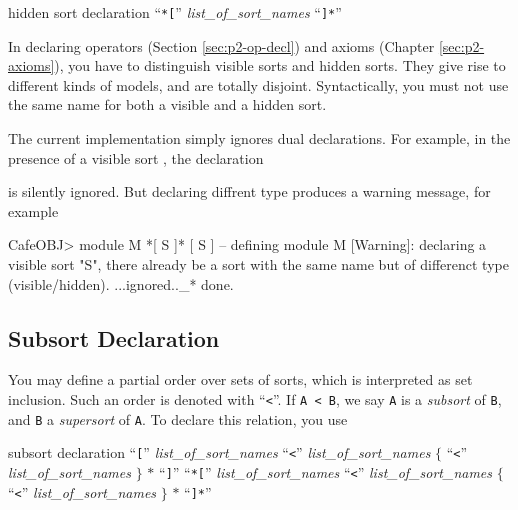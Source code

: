 \documentclass[a4paper]{memoir}
\begin{document}
\begin{bsyntax} hidden sort declaration \Hline
{}
``\texttt{*[}'' \textit{list\_of\_sort\_names} ``\texttt{]*}''
\end{bsyntax}

In declaring operators (Section \ref{sec:p2-op-decl}) and
axioms (Chapter \ref{sec:p2-axioms}), you have to
distinguish visible sorts and hidden sorts. They
give rise to different kinds of models, and are totally
disjoint. Syntactically, you must not use the same name for
both a visible and a hidden sort.

\begin{warning}
  The current implementation simply ignores dual declarations.
  For example, in the presence of a visible sort , the
  declaration
  \begin{ccode}
    [ S ]
  \end{ccode}
  is silently ignored. But declaring diffrent type produces
  a warning message, for example
  \begin{snugshade}
  \begin{ccode}
    CafeOBJ> module M { *[ S ]* [ S ] }
    -- defining module M
    [Warning]: declaring a visible sort "S", there already be a sort
        with the same name but of differenct type (visible/hidden).
        ...ignored.._* done.
  \end{ccode}
\end{snugshade}
\end{warning}

\subsection{Subsort Declaration}

You may define a partial order over sets of sorts, which is
interpreted as set inclusion.
Such an order is denoted with ``\verb|<|''. If \verb|A < B|,
we say \verb|A| is a {\em subsort} of \verb|B|,
and \verb|B| a {\em supersort}
of \verb|A|. To declare this relation, you use

\begin{bsyntax} subsort declaration \index{\texttt{<}} \Hline
``\texttt{[}'' \textit{list\_of\_sort\_names} ``\texttt{<}'' \textit{list\_of\_sort\_names} $\{$ ``\texttt{<}'' \textit{list\_of\_sort\_names} $\}$ $*$ ``\texttt{]}''
``\texttt{*[}'' \textit{list\_of\_sort\_names} ``\texttt{<}'' \textit{list\_of\_sort\_names} $\{$ ``\texttt{<}'' \textit{list\_of\_sort\_names} $\}$ $*$ ``\texttt{]*}''
\end{bsyntax}
\end{document}
